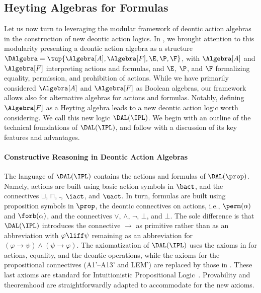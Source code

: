 \subsection{Heyting Algebras for Formulas}\label{sec:heyting:formulas}

Let us now turn to leveraging the modular framework of deontic action algebras in the construction of new deontic action logics.
In , we brought attention to this modularity presenting a deontic action algebra as a structure $\DAlgebra = \tup{\Algebra[A], \Algebra[F], \E, \P, \F}$, with $\Algebra[A]$ and $\Algebra[F]$ interpreting actions and formulas, and $\E$, $\P$, and $\F$ formalizing equality, permission, and prohibition of actions.
While we have primarily considered $\Algebra[A]$ and $\Algebra[F]$ as Boolean algebras, our framework allows also for alternative algebras for actions and formulas.
Notably, defining $\Algebra[F]$ as a Heyting algebra leads to a new deontic action logic worth considering.
We call this new logic $\DAL(\IPL)$.
We begin with an outline of the technical foundations of $\DAL(\IPL)$, and follow with a discussion of its key features and advantages.

\paragraph{Constructive Reasoning in Deontic Action Algebras}

The language of $\DAL(\IPL)$ contains the actions and formulas of $\DAL(\prop)$. Namely, actions are built using basic action symbols in $\bact$, and the connectives $\sqcup$, $\sqcap$, $\bar{~}$, $\iact$, and $\uact$.
In turn, formulas are built using proposition symbols in $\prop$, the deontic connectives on actions, i.e., $\perm(\alpha)$ and $\forb(\alpha)$, and the connectives $\lor$, $\land$, $\lnot$, $\bot$, and $\bot$.
The sole difference is that $\DAL(\IPL)$ introduces the connective $\to$ as primitive rather than as an abbreviation \textemdash with $\varphi \liff \psi$ remaining as an abbreviation for $(\varphi \to \psi) \land (\psi \to \varphi)$.
The axiomatization of $\DAL(\IPL)$ uses the axioms in  for actions, equality, and the deontic operations, while the axioms for the propositional connectives (A1'--A13' and LEM') are replaced by those in .
These last axioms are standard for Intuitionistic Propositional Logic~\cite{Troelstra:1988}.
Provability and theoremhood are straightforwardly adapted to accommodate for the new axioms.

